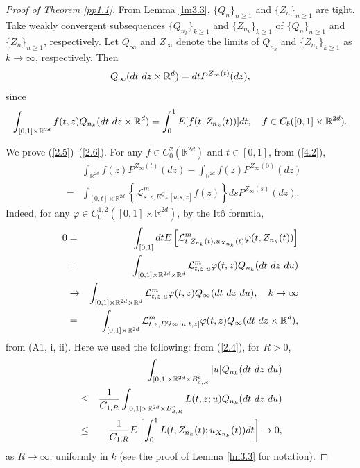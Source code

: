 \documentclass[12pt]{article}
\begin{document}
\begin{proof}[Proof of Theorem \ref{pp1.1}]
From Lemma \ref{lm3.3}, $\{Q_n\}_{n\ge 1}$ and $\{Z_n\}_{n\ge 1}$ are tight.
Take weakly convergent subsequences $\{Q_{n_k}\}_{k\ge 1}$ and $\{Z_{n_k}\}_{k\ge 1}$ of $\{Q_n\}_{n\ge 1}$
 and $\{Z_n\}_{n\ge 1}$, respectively.
Let $Q_\infty$ and $Z_\infty$ denote the limits of $Q_{n_k} $ and $\{Z_{n_k}\}_{k\ge 1}$
as $k\to\infty$, respectively.
Then 
\begin{equation}\label{4.2}
Q_\infty(dt\hbox{ }dz\times \mathbb{R}^d)=dtP^{Z_\infty(t)}(dz),
\end{equation}
since 
$$\int_{[0,1]\times \mathbb{R}^{2d}}f(t,z)Q_{n_k}(dt\hbox{ }dz\times \mathbb{R}^d)
=\int_0^1 E[f(t,Z_{n_k}(t))]dt,\quad f\in C_b([0,1]\times \mathbb{R}^{2d}).
$$

We prove (\ref{2.5})--(\ref{2.6}).
For any $f\in C_0^{2}(\mathbb{R}^{2d})$ and $t\in [0,1]$, from (\ref{4.2}),
\begin{eqnarray}\label{4.3.0}
&&\int_{ \mathbb{R}^{2d}}f(z)P^{Z_\infty(t)}(dz)-
\int_{ \mathbb{R}^{2d}}f(z)P^{Z_\infty(0)}(dz)\\
&=&\int_{[0,t]\times \mathbb{R}^{2d}}
\left\{\mathcal{L}^m_{s,z, E^{Q_\infty}[u|s,z]}f(z)\right\}dsP^{Z_\infty(s)}(dz).\nonumber
\end{eqnarray}
Indeed, for any $\varphi\in C_0^{1,2}([0,1]\times \mathbb{R}^{2d})$, by the It\^o formula,  
\begin{eqnarray}\label{4.4}
0&=&\int_{[0,1]}dt
E\left[\mathcal{L}^m_{t,Z_{n_k}(t),u_{X_{n_k}}(t)}\varphi(t,Z_{n_k}(t))\right]\\
&=&\int_{[0,1]\times \mathbb{R}^{2d}\times \mathbb{R}^{d}}
\mathcal{L}^m_{t,z,u}\varphi(t,z)Q_{n_k} (dt\hbox{ }dz\hbox{ }du)\nonumber\\
&\to&\int_{[0,1]\times \mathbb{R}^{2d}\times \mathbb{R}^{d}}
\mathcal{L}^m_{t,z,u}\varphi(t,z)Q_\infty(dt\hbox{ }dz\hbox{ }du),
\quad k\to\infty\nonumber\\
&=&\int_{[0,1]\times \mathbb{R}^{2d}}
\mathcal{L}^m_{t,z, E^{Q_\infty}[u|t,z]}\varphi(t,z)Q_\infty(dt\hbox{ }dz\times \mathbb{R}^d),\nonumber
\end{eqnarray}
from (A1, i, ii).
Here we used the following: from (\ref{2.4}), for $R>0$,
\begin{eqnarray}\label{4.5.0}
&&\int_{[0,1]\times \mathbb{R}^{2d}\times B_{d,R}^c} |u|Q_{n_k} (dt\hbox{ }dz\hbox{ }du)\\
& \le& \frac{1}{C_{1,R}
}\int_{[0,1]\times \mathbb{R}^{2d}\times B_{d,R}^c} L(t,z;u)Q_{n_k} (dt\hbox{ }dz\hbox{ }du)\nonumber\\
&\le&  \frac{1}{C_{1,R}
}
E\left[\int_0^1 L(t,Z_{n_k}(t);u_{X_{n_k}}(t))dt\right] 
\to 0,\nonumber
\end{eqnarray}
as $R\to\infty$, uniformly in $k$ (see the proof of Lemma \ref{lm3.3} for notation).



\end{proof}
\end{document}
